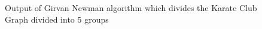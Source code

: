 \begin{itemize}
\begin{figure}[h!]
\begin{center}
\caption{Output of Girvan Newman algorithm which divides the Karate Club Graph divided into 5 groups}
\label{fig:q2fig13}
\end{center}
\end{figure}
\end{itemize}